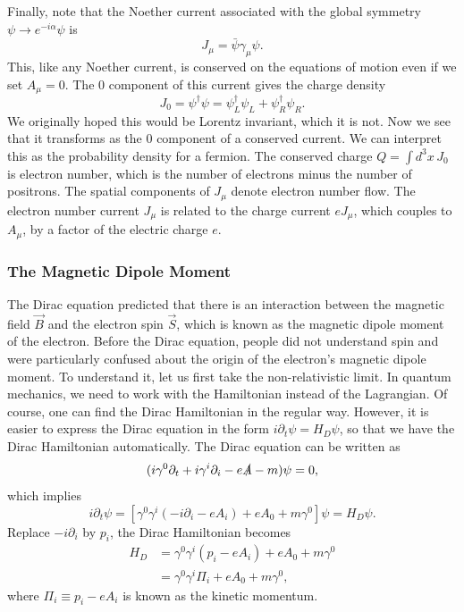 \documentclass[11pt]{article}
\theoremstyle{definition}
\begin{document}
Finally, note that the Noether current associated with the global symmetry \(\psi \to e^{-i\alpha}\psi\) is
\begin{equation}
J_{\mu} = \bar{\psi}\gamma_{\mu}\psi.
\end{equation}
This, like any Noether current, is conserved on the equations of motion even if we set \(A_{\mu} = 0\). The 0 component of this current gives the charge density
\begin{equation}
J_{0} = \psi^{\dagger}\psi = \psi^{\dagger}_{L}\psi_{L} + \psi^{\dagger}_{R}\psi_{R}.
\end{equation}
We originally hoped this would be Lorentz invariant, which it is not. Now we see that it transforms as the 0 component of a conserved current. We can interpret this as the probability density for a fermion. The conserved charge \(Q = \int d^{3}x\, J_{0}\) is electron number, which is the number of electrons minus the number of positrons. The spatial components of \(J_{\mu}\) denote electron number flow. The electron number current \(J_{\mu}\) is related to the charge current \(eJ_{\mu}\), which couples to \(A_{\mu}\), by a factor of the electric charge \(e\).

\subsubsection{The Magnetic Dipole Moment}
The Dirac equation predicted that there is an interaction between the magnetic field $\vec{B}$ and the electron spin $\vec{S}$, which is known as the magnetic dipole moment of the electron. Before the Dirac equation, people did not understand spin and were particularly confused about the origin of the electron's magnetic dipole moment. To understand it, let us first take the non-relativistic limit. In quantum mechanics, we need to work with the Hamiltonian instead of the Lagrangian. Of course, one can find the Dirac Hamiltonian in the regular way. However, it is easier to express the Dirac equation in the form $i\partial_t\psi = H_D \psi$, so that we have the Dirac Hamiltonian automatically. The Dirac equation can be written as
\begin{equation}
    (i\gamma^0\partial_t + i\gamma^i\partial_i - e\slashed{A} - m )\psi = 0,
\end{equation}
which implies
\begin{equation}
    i\partial_t\psi = [\gamma^0\gamma^i(-i\partial_i-eA_i) + eA_0  + m\gamma^0]\psi = H_D\psi.
\end{equation}
Replace $-i\partial_i$ by $p_i$, the Dirac Hamiltonian becomes
\begin{equation}
\begin{aligned}
        H_D &= \gamma^0\gamma^i(p_i-eA_i) + eA_0  + m\gamma^0\\
        &= \gamma^0\gamma^i\Pi_i + eA_0  + m\gamma^0,
\end{aligned}
\end{equation}
where $\Pi_i \equiv p_i-eA_i$ is known as the kinetic momentum. 
\end{document}
